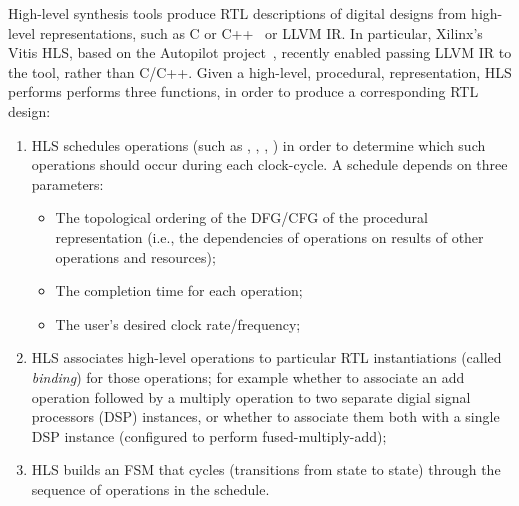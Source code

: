 High-level synthesis tools produce RTL descriptions of digital designs from high-level representations, such as C or C++~\cite{10.1145/2514740, ferrandi2021bambu} or LLVM IR.
In particular, Xilinx's Vitis HLS, based on the Autopilot project~\cite{Zhang2008}, recently enabled passing LLVM IR to the tool, rather than C/C++.
Given a high-level, procedural, representation, HLS performs performs three functions, in order to produce a corresponding RTL design:
\begin{enumerate}
	\item HLS schedules operations (such as , , , ) in order to determine which such operations should occur during each clock-cycle. A schedule depends on three parameters:
	      \begin{itemize}
		      \item The topological ordering of the DFG/CFG of the procedural representation (i.e., the dependencies of operations on results of other operations and resources);
		      \item The completion time for each operation;
		      \item The user's desired clock rate/frequency;
	      \end{itemize}
	\item HLS associates high-level operations to particular RTL instantiations (called \emph{binding}) for those operations; for example whether to associate an add operation followed by a multiply operation to two separate digial signal processors (DSP) instances, or whether to associate them both with a single DSP instance (configured to perform fused-multiply-add);
	\item HLS builds an FSM that cycles (transitions from state to state) through the sequence of operations in the schedule.
\end{enumerate}

